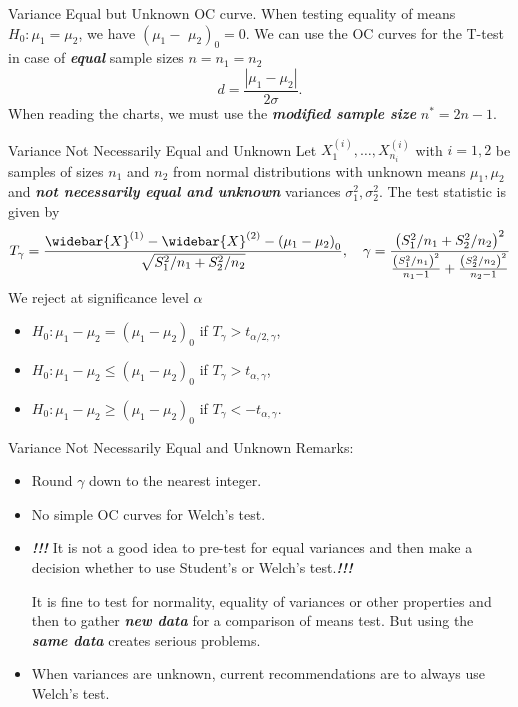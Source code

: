 \documentclass{beamer}
\newcommand{\bb}[1]{\textcolor{antiquefuchsia}{\textbf{\textit{#1}}}}
\begin{document}
\begin{frame}{Variance Equal but Unknown}
OC curve. When testing equality of means $H_{0}: \mu_{1}=\mu_{2}$, we have $\left(\mu_{1}-\right.$ $\left.\mu_{2}\right)_{0}=0$. We can use the OC curves for the T-test in case of \bb{equal} sample sizes $n=n_{1}=n_{2}$
$$
d=\frac{\left|\mu_{1}-\mu_{2}\right|}{2 \sigma} .
$$
When reading the charts, we must use the \bb{modified sample size} $n^{*}=2 n-1$.
\end{frame}

\begin{frame}{Variance Not Necessarily Equal and Unknown}
Let $X_{1}^{(i)}, \ldots, X_{n_{i}}^{(i)}$ with $i=1,2$ be samples of sizes $n_{1}$ and $n_{2}$ from normal distributions with unknown means $\mu_{1}, \mu_{2}$ and \bb{not necessarily equal and unknown} variances $\sigma_{1}^{2}, \sigma_{2}^{2}$. The test statistic is given by
$$
T_{\gamma}=\frac{\widebar{X}^{(1)}-\widebar{X}^{(2)}-\left(\mu_{1}-\mu_{2}\right)_{0}}{\sqrt{S_{1}^{2} / n_{1}+S_{2}^{2} / n_{2}}}, \quad \gamma=\frac{\left(S_{1}^{2} / n_{1}+S_{2}^{2} / n_{2}\right)^{2}}{\frac{\left(S_{1}^{2} / n_{1}\right)^{2}}{n_{1}-1}+\frac{\left(S_{2}^{2} / n_{2}\right)^{2}}{n_{2}-1}}
$$
We reject at significance level $\alpha$
\begin{itemize}
\item $H_{0}: \mu_{1}-\mu_{2}=\left(\mu_{1}-\mu_{2}\right)_{0}$ if $T_{\gamma}>t_{\alpha / 2, \gamma}$,
\item $H_{0}: \mu_{1}-\mu_{2} \leq\left(\mu_{1}-\mu_{2}\right)_{0}$ if $T_{\gamma}>t_{\alpha, \gamma}$,
\item $H_{0}: \mu_{1}-\mu_{2} \geq\left(\mu_{1}-\mu_{2}\right)_{0}$ if $T_{\gamma}<-t_{\alpha, \gamma}$.
\end{itemize}
\end{frame}

\begin{frame}{Variance Not Necessarily Equal and Unknown}
Remarks:
\begin{itemize}
\item Round $\gamma$ down to the nearest integer.
\item No simple OC curves for Welch's test.
\item \bb{!!!} It is not a good idea to pre-test for equal variances and then make a decision whether to use Student's or Welch's test.\bb{!!!}

It is fine to test for normality, equality of variances or other properties and then to gather \bb{new data} for a comparison of means test. But using the \bb{same data} creates serious problems.
\item When variances are unknown, current recommendations are to always use Welch's test.
\end{itemize}
\end{frame}
\end{document}
